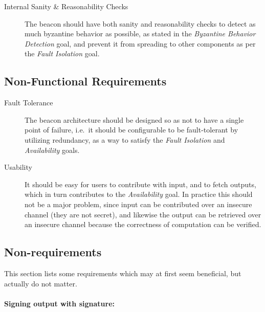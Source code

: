 \begin{description}
\item [Internal Sanity \& Reasonability Checks]
The beacon should have both sanity and reasonability checks to detect as much byzantine behavior as possible, as stated in the \emph{Byzantine Behavior Detection} goal, and prevent it from spreading to other components as per the \emph{Fault Isolation} goal.

\end{description}

\subsection{Non-Functional Requirements}
\label{sub:non_functional_requirements}

\begin{description}
    \item[Fault Tolerance]
The beacon architecture should be designed so as not to have a single point of failure, i.e.\ it should be configurable to be fault-tolerant by utilizing redundancy, as a way to satisfy the \emph{Fault Isolation} and \emph{Availability} goals.


    \item[Usability]
It should be easy for users to contribute with input, and to fetch outputs, which in turn contributes to the \emph{Availability} goal.
In practice this should not be a major problem, since input can be contributed over an insecure channel (they are not secret), and likewise the output can be retrieved over an insecure channel because the correctness of computation can be verified.
\end{description}

\subsection{Non-requirements}
This section lists some requirements which may at first seem beneficial, but actually do not matter.

\paragraph{Signing output with signature:}

